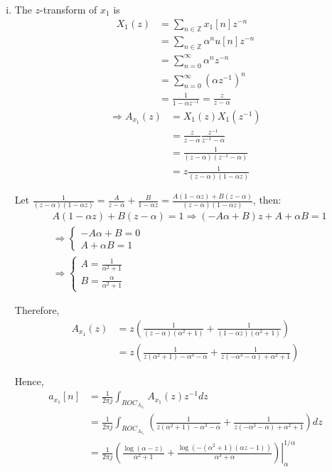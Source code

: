 \begin{enumerate}[(a)]
\begin{enumerate}[i.]
	\item The $z$-transform of $x_1$ is
	\begin{align*}
		X_1(z) 
		&= \sum_{n \in \mathbb{Z}} x_1[n] z^{-n} \\
		&= \sum_{n \in \mathbb{Z}} \alpha^n u[n] z^{-n} \\
		&= \sum_{n=0}^{\infty} \alpha^n z^{-n} \\
		&= \sum_{n=0}^{\infty} (\alpha z^{-1})^n \\
		&= \frac{1}{1 - \alpha z^{-1}} = \frac{z}{z - \alpha}
	\end{align*}
	\begin{align*}
		\Rightarrow A_{x_1}(z) 
		&= X_1(z) X_1(z^{-1}) \\
		&= \frac{z}{z - \alpha} \frac{z^{-1}}{z^{-1} - \alpha} \\
		&= \frac{1}{(z - \alpha)(z^{-1} - \alpha)} \\
		&= z\frac{1}{(z - \alpha)(1 - \alpha z)}
	\end{align*}
	
	Let $\frac{1}{(z - \alpha)(1 - \alpha z)}  = \frac{A}{z - \alpha} + \frac{B}{1- \alpha z} = \frac{A(1 - \alpha z) + B(z - \alpha)}{(z - \alpha)(1 - \alpha z)}$, then:
	\begin{align*}
		&A(1 - \alpha z) + B(z - \alpha) = 1 \Rightarrow (-A \alpha + B)z + A + \alpha B = 1 \\
		&\Rightarrow \begin{cases}
		-A \alpha + B = 0 \\
		A + \alpha B = 1
		\end{cases} \\
		&\Rightarrow \begin{cases}
		A = \frac{1}{\alpha^2 + 1} \\
		B = \frac{\alpha}{\alpha^2 + 1}
		\end{cases}
	\end{align*}
	
	Therefore,
	\begin{align*}
		A_{x_1}(z) 
		&= z \left( \frac{1}{(z - \alpha)(\alpha^2 + 1)} + \frac{1}{(1-\alpha z)(\alpha^2 + 1)} \right) \\
		&= z \left( \frac{1}{z(\alpha^2+1) - \alpha^3 - \alpha} + \frac{1}{z(-\alpha^3 - \alpha) + \alpha^2 +1} \right)
	\end{align*}
	
	Hence,
	\begin{align*}
		a_{x_1}[n] &= \frac{1}{2 \pi j} \int_{ROC_{A_{x_1}}} A_{x_1}(z) z^{-1} dz \\
		&= \frac{1}{2 \pi j} \int_{ROC_{A_{x_1}}} \left( \frac{1}{z(\alpha^2+1) - \alpha^3 - \alpha} + \frac{1}{z(-\alpha^3 - \alpha) + \alpha^2 +1} \right)dz \\
		&= \frac{1}{2 \pi j} \left. \left( \frac{\log(\alpha - z)}{\alpha^2 + 1}  + \frac{\log(-(\alpha^2+1)(\alpha z-1))}{\alpha^3 + \alpha} \right)\right|_{\alpha}^{1/\alpha}
	\end{align*}
	

\end{enumerate}
\end{enumerate}
